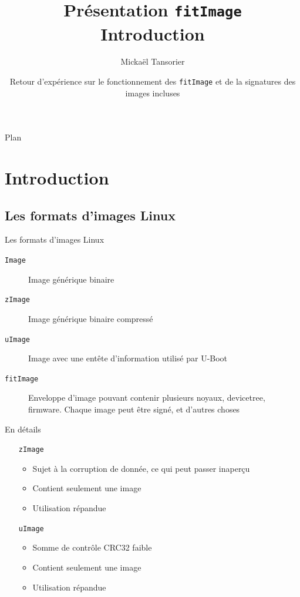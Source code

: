 \documentclass[aspectratio=169]{beamer}
\title[U-Boot]{Présentation \texttt{fitImage} \\ \textbf{Introduction}}
\author[Mickaël Tansorier]{Mickaël Tansorier}
\date[Août 2018]{Retour d'expérience sur le fonctionnement des \texttt{fitImage} et \newline de la signatures des images incluses}
\begin{document}

\begin{frame}
\titlepage
\end{frame}



\begin{frame}{Plan}
\tableofcontents[hideallsubsections]
\end{frame}

\section{Introduction}

\subsection{Les formats d'images Linux}

\begin{frame}
\begin{center}
\huge{Les formats d'images Linux}
\end{center}
\end{frame}

\begin{frame}
\begin{description}
	\item[\texttt{Image}] Image générique binaire
	\item[\texttt{zImage}] Image générique binaire compressé
	\item[\texttt{uImage}] Image avec une entête d'information utilisé par U-Boot
	\item[\texttt{fitImage}] Enveloppe d'image pouvant contenir plusieurs noyaux, devicetree, firmware. Chaque image peut être signé, et d'autres choses
\end{description}
\end{frame}

\begin{frame}{En détails}
\begin{itemize}
	\item [\texttt{zImage}]
	\begin{itemize}
		\item Sujet à la corruption de donnée, ce qui peut passer inaperçu
		\item Contient seulement une image
		\item Utilisation répandue
	\end{itemize}
	\item [\texttt{uImage}]
	\begin{itemize}
		\item Somme de contrôle CRC32 faible
		\item Contient seulement une image
		\item Utilisation répandue
	\end{itemize}
\end{itemize}
\end{frame}
\end{document}
